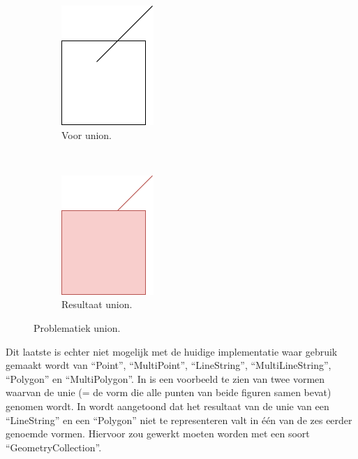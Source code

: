\begin{figure}
    \centering
    \begin{subfigure}[t]{0.5\linewidth}
        \centering
        \includegraphics[width=0.3\linewidth]{images/union_example1.png}
        \caption{Voor union.}
        \label{fig:union_example1}
    \end{subfigure}%
    ~ 
    \begin{subfigure}[t]{0.5\linewidth}
        \centering
        \includegraphics[width=0.3\linewidth]{images/union_example2.png}
        \caption{Resultaat union.}
        \label{fig:union_example2}
    \end{subfigure}
    \caption{Problematiek union.}
\end{figure}

Dit laatste is echter niet mogelijk met de huidige implementatie waar gebruik gemaakt wordt van ``Point'', ``MultiPoint'', ``LineString'', ``MultiLineString'', ``Polygon'' en ``MultiPolygon''. In  is een voorbeeld te zien van twee vormen waarvan de unie (= de vorm die alle punten van beide figuren samen bevat) genomen wordt. In  wordt aangetoond dat het resultaat van de unie van een ``LineString'' en een ``Polygon'' niet te representeren valt in één van de zes eerder genoemde vormen. Hiervoor zou gewerkt moeten worden met een soort ``GeometryCollection''.